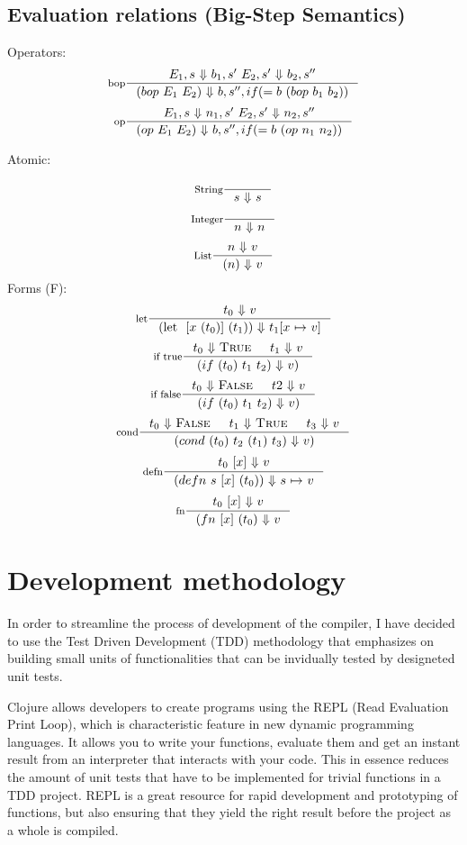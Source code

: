 \subsection{Evaluation relations (Big-Step Semantics)}
Operators:
\[
\inference[bop]{E_1, s \ $$\Downarrow$$ \ b_1, s' \ E_2, s' \ $$\Downarrow$$ \ b_2, s''}
{(bop \ E_1 \ E_2) \ $$\Downarrow$$ \ b, s'', if (= b \ (bop \ b_1 \ b_2))}
\]
\[
\inference[op]{E_1, s \ $$\Downarrow$$ \ n_1, s' \ E_2, s' \ $$\Downarrow$$ \ n_2, s''}
{(op \ E_1 \ E_2) \ $$\Downarrow$$ \ b, s'', if (= b \ (op \ n_1 \ n_2))}
\]


Atomic:

\[
\inference[String]{}
{s \ $$\Downarrow$$ \ s}
\]
\[
\inference[Integer]{}
{n \ $$\Downarrow$$ \ n}
\]
\[
\inference[List]{n \ $$\Downarrow$$ \ v}
{(n) \ $$\Downarrow$$ \ v}
\]
Forms (F):
\[
\inference[let]{t_0 \ $$\Downarrow$$ \ v}
{(\text{let } \ {[x \ (t_0)]} \ (t_1)) \ $$\Downarrow$$ \ t_1 {[}x \ $$\mapsto$$ \ v{]} }
\]
\[
\inference[if true]{{t_0} \ $$\Downarrow$$ \ \textsc{True} & t_1 \ $$\Downarrow$$ \ v}
{(if \ (t_0) \ t_1 \ t_2) \ $$\Downarrow$$ \ v) }
\]
\[
\inference[if false]{t_0 \ $$\Downarrow$$ \ \textsc{False} & t2 \ $$\Downarrow$$ \ v}
{(if \ (t_0) \ t_1 \ t_2) \ $$\Downarrow$$ \ v) }
\]
\[
\inference[cond]{t_0 \ $$\Downarrow$$ \ \textsc{False} & t_1 \ $$\Downarrow$$ \ \textsc{True} & t_3 \ $$\Downarrow$$ \ v}
{(cond \ (t_0) \ t_2 \ (t_1) \ t_3) \ $$\Downarrow$$ \ v) }
\]
\[
\inference[defn]{ {t_0 \ [x]} \ $$\Downarrow$$ \ v}
{(defn \ s \ {[x]} \ (t_0)) \ $$\Downarrow$$ \ s \ $$\mapsto$$ \ v }
\]
\[
\inference[fn]{ {t_0 \ [x]} \ $$\Downarrow$$ \ v}
{(fn \ {[x]}  \ (t_0) \ $$\Downarrow$$ \ v }
\]

\section{Development methodology}
In order to streamline the process of development of the compiler, I have decided to use the Test Driven Development (TDD) methodology that emphasizes on building small units of functionalities that can be invidually tested by designeted unit tests. 

Clojure allows developers to create programs using the REPL (Read Evaluation Print Loop), which is characteristic feature in new dynamic programming languages. It allows you to write your functions, evaluate them and get an instant result from an interpreter that interacts with your code. This in essence reduces the amount of unit tests that have to be implemented for trivial functions in a TDD project. 
REPL is a great resource for rapid development and prototyping of functions, but also ensuring that they yield the right result before the project as a whole is compiled.

